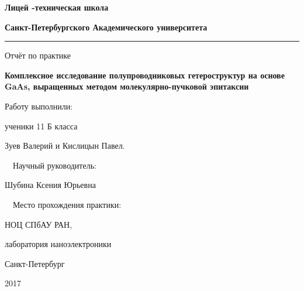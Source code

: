 \documentclass[../FinalReport.tex]{subfiles}
\begin{document}
\begin{titlepage}

\begin{centering}

\textbf{Лицей -техническая школа\rk}
\par
\textbf{Санкт-Петербургского  Академического  университета }
\vspace{10 pt}
\hrule
\vfill

\LARGE{Отчёт по практике}

\vfill

\Large \textbf {Комплексное исследование полупроводниковых гетероструктур на основе GaAs, выращенных методом молекулярно-пучковой эпитаксии}
\vfill
\vfill

\normalsize
\begin{flushright}
Работу выполнили:

ученики 11 Б класса

Зуев Валерий и Кислицын Павел.

~\
Научный руководитель:

Шубина Ксения Юрьевна

~\
Место прохождения практики:

НОЦ СПбАУ РАН,

лаборатория наноэлектроники

\end{flushright}

\vfill
\vfill

Санкт-Петербург
\par
2017

\end{centering}
\end{titlepage}
\end{document}
